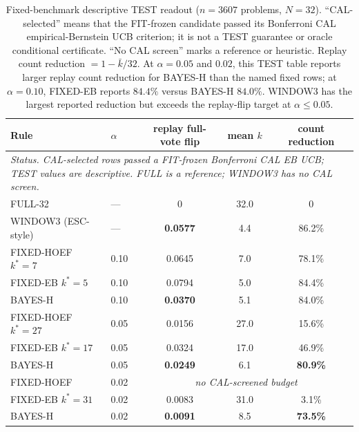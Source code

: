 \documentclass{article}
\theoremstyle{definition}
\theoremstyle{remark}
\begin{document}
\begin{table}[t]
\centering\small
\caption{Fixed-benchmark descriptive TEST readout ($n=3607$ problems,
$N=32$). ``CAL-selected'' means that the FIT-frozen candidate passed its
Bonferroni CAL empirical-Bernstein UCB criterion; it is not a TEST guarantee
or oracle conditional certificate. ``No CAL screen'' marks a reference
or heuristic. Replay count reduction $=1-\bar k/32$. At $\alpha=0.05$ and
$0.02$, this TEST table reports larger replay count reduction for BAYES-H than
the named fixed rows; at $\alpha=0.10$, FIXED-EB reports $84.4\%$ versus
BAYES-H $84.0\%$. WINDOW3 has the largest reported reduction but exceeds the
replay-flip target at $\alpha\le0.05$.}
\label{tab:main}
\begin{tabular}{llccc}
\toprule
Rule & $\alpha$ & replay full-vote flip & mean $k$ & count reduction \\
\midrule
\multicolumn{5}{p{0.92\linewidth}}{\textit{Status. CAL-selected rows passed a FIT-frozen Bonferroni CAL EB UCB; TEST values are descriptive. FULL is a reference; WINDOW3 has no CAL screen.}} \\
FULL-32 & --- & 0 & 32.0 & 0 \\
WINDOW3 (ESC-style) & --- & \textbf{0.0577} & 4.4 & 86.2\% \\
\midrule
FIXED-HOEF $k^*{=}7$  & 0.10 & 0.0645 & 7.0 & 78.1\% \\
FIXED-EB   $k^*{=}5$  & 0.10 & 0.0794 & 5.0 & 84.4\% \\
BAYES-H               & 0.10 & \textbf{0.0370} & 5.1 & 84.0\% \\
\midrule
FIXED-HOEF $k^*{=}27$ & 0.05 & 0.0156 & 27.0 & 15.6\% \\
FIXED-EB   $k^*{=}17$ & 0.05 & 0.0324 & 17.0 & 46.9\% \\
BAYES-H               & 0.05 & \textbf{0.0249} & 6.1 & \textbf{80.9\%} \\
\midrule
FIXED-HOEF & 0.02 & \multicolumn{3}{c}{\emph{no CAL-screened budget}} \\
FIXED-EB   $k^*{=}31$ & 0.02 & 0.0083 & 31.0 & 3.1\% \\
BAYES-H               & 0.02 & \textbf{0.0091} & 8.5 & \textbf{73.5\%} \\
\bottomrule
\end{tabular}
\end{table}
\end{document}
